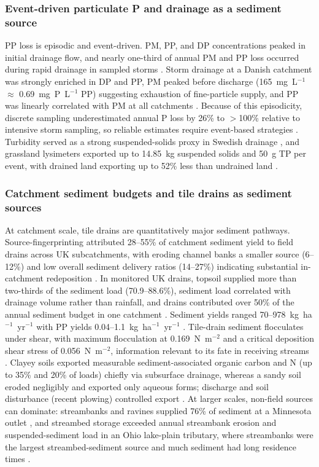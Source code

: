 \subsubsection{Event-driven particulate P and drainage as a sediment source}

PP loss is episodic and event-driven. PM, PP, and DP concentrations peaked in initial
drainage flow, and nearly one-third of annual PM and PP loss occurred during rapid
drainage in sampled storms \parencite{Laubel1999}. Storm drainage at a Danish
catchment was strongly enriched in DP and PP, PM peaked before discharge (165~mg~L$^{-1}$
$\approx$ 0.69~mg~P~L$^{-1}$ PP) suggesting exhaustion of fine-particle supply, and PP
was linearly correlated with PM at all catchments \parencite{Grant1996}. Because of
this episodicity, discrete sampling underestimated annual P loss by 26\% to $>$100\%
relative to intensive storm sampling, so reliable estimates require event-based
strategies \parencite{Grant1996}. Turbidity served as a strong suspended-solids proxy
in Swedish drainage \parencite{Ulén2018}, and grassland lysimeters exported up to
14.85~kg suspended solids and 50~g TP per event, with drained land exporting up to
52\% less than undrained land \parencite{Bilotta2008}.

\subsubsection{Catchment sediment budgets and tile drains as sediment sources}

At catchment scale, tile drains are quantitatively major sediment pathways.
Source-fingerprinting attributed 28--55\% of catchment sediment yield to field drains
across UK subcatchments, with eroding channel banks a smaller source (6--12\%) and low
overall sediment delivery ratios (14--27\%) indicating substantial in-catchment
redeposition \parencite{Walling2002}. In monitored UK drains, topsoil supplied more
than two-thirds of the sediment load (70.9--88.6\%), sediment load correlated with
drainage volume rather than rainfall, and drains contributed over 50\% of the annual
sediment budget in one catchment \parencite{Chapman2005}. Sediment yields ranged
70--978~kg~ha$^{-1}$~yr$^{-1}$ with PP yields 0.04--1.1~kg~ha$^{-1}$~yr$^{-1}$
\parencite{Chapman2005}. Tile-drain sediment flocculates under shear, with maximum
flocculation at 0.169~N~m$^{-2}$ and a critical deposition shear stress of
0.056~N~m$^{-2}$, information relevant to its fate in receiving streams
\parencite{Stone1997}. Clayey soils exported measurable sediment-associated organic
carbon and N (up to 35\% and 20\% of loads) chiefly via subsurface drainage, whereas a
sandy soil eroded negligibly and exported only aqueous forms; discharge and soil
disturbance (recent plowing) controlled export \parencite{Manninen2023}. At larger
scales, non-field sources can dominate: streambanks and ravines supplied 76\% of
sediment at a Minnesota outlet \parencite{Dalzell2018}, and streambed storage exceeded
annual streambank erosion and suspended-sediment load in an Ohio lake-plain tributary,
where streambanks were the largest streambed-sediment source and much sediment had long
residence times \parencite{Williamson2025}.

